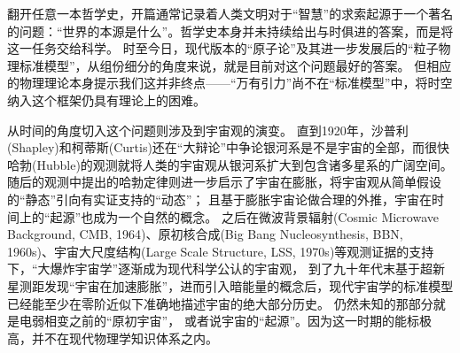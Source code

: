 

翻开任意一本哲学史，开篇通常记录着人类文明对于“智慧”的求索起源于一个著名的问题：“世界的本源是什么”。哲学史本身并未持续给出与时俱进的答案，而是将这一任务交给科学。
时至今日，现代版本的“原子论”及其进一步发展后的“粒子物理标准模型”，从组份细分的角度来说，就是目前对这个问题最好的答案。
但相应的物理理论本身提示我们这并非终点——“万有引力”尚不在“标准模型”中，将时空纳入这个框架仍具有理论上的困难。

从时间的角度切入这个问题则涉及到宇宙观的演变。
直到1920年，沙普利(Shapley)和柯蒂斯(Curtis)还在“大辩论”中争论银河系是不是宇宙的全部，而很快哈勃(Hubble)的观测就将人类的宇宙观从银河系扩大到包含诸多星系的广阔空间。%
随后的观测中提出的哈勃定律则进一步启示了宇宙在膨胀，将宇宙观从简单假设的“静态”引向有实证支持的“动态”；%
且基于膨胀宇宙论做合理的外推，宇宙在时间上的“起源”也成为一个自然的概念。
之后在微波背景辐射(Cosmic Microwave Background, CMB, 1964)、原初核合成(Big Bang Nucleosynthesis, BBN, 1960s)、宇宙大尺度结构(Large Scale Structure, LSS, 1970s)等观测证据的支持下，“大爆炸宇宙学”逐渐成为现代科学公认的宇宙观，
到了九十年代末基于超新星测距发现“宇宙在加速膨胀”，进而引入暗能量的概念后，现代宇宙学的标准模型已经能至少在零阶近似下准确地描述宇宙的绝大部分历史。
仍然未知的那部分就是电弱相变之前的“原初宇宙”，%
或者说宇宙的“起源”。因为这一时期的能标极高，并不在现代物理学知识体系之内。


